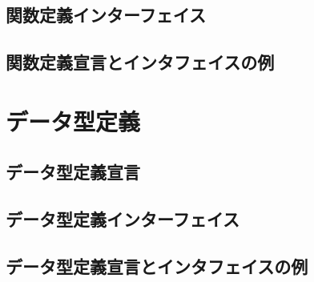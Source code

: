 \documentclass{jbook}
\newif\ifjp
\newcommand{\txt}[2]{#1}
\begin{document}
\subsection{\txt{関数定義インターフェイス}{}}
\ifjp%
\else%
\fi%

\subsection{\txt{関数定義宣言とインタフェイスの例}{}}
\ifjp%
\else%
\fi%

\section{\txt{データ型定義}{}}
\ifjp%
\else%
\fi%


\subsection{\txt{データ型定義宣言}{}}
\ifjp%
\else%
\fi%

\subsection{\txt{データ型定義インターフェイス}{}}
\ifjp%
\else%
\fi%

\subsection{\txt{データ型定義宣言とインタフェイスの例}{}}
\ifjp%
\else%
\fi%
\end{document}
